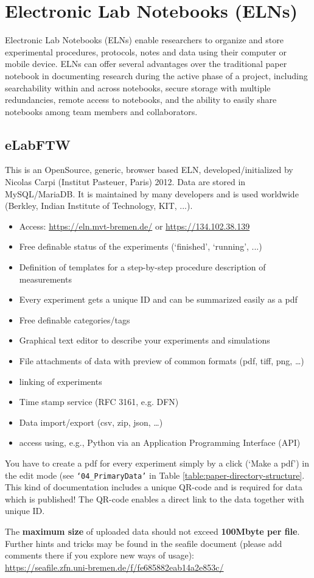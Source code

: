 \section[Electronic Lab Notebooks]{Electronic Lab Notebooks (ELNs)}\label{ssc:ELN}

Electronic Lab Notebooks (ELNs) enable researchers to organize and store
experimental procedures, protocols, notes and data using their computer or
mobile device. ELNs can offer several advantages over the traditional paper
notebook in documenting research during the active phase of a project, including
searchability within and across notebooks, secure storage with multiple
redundancies, remote access to notebooks, and the ability to easily share
notebooks among team members and collaborators.

\subsection{eLabFTW}

This is an OpenSource, generic, browser based ELN, developed/initialized by
Nicolas Carpi (Institut Pasteuer, Paris) 2012. Data are stored in MySQL/MariaDB.
It is maintained by many developers and is used worldwide (Berkley, Indian
Institute of Technology, KIT, ...).
\begin{itemize}
  \item Access: \url{https://eln.mvt-bremen.de/} or \url{https://134.102.38.139}
  \item Free definable status of the experiments (`finished', `running', ...)
  \item Definition of templates for a step-by-step procedure description of
        measurements
  \item Every experiment gets a unique ID and can be summarized easily as a pdf
  \item Free definable categories/tags
  \item Graphical text editor to describe your experiments and simulations
  \item File attachments of data with preview of common formats (pdf, tiff, png, …)
  \item linking of experiments
  \item Time stamp service (RFC 3161, e.g. DFN)
  \item Data import/export (csv, zip, json, …)
  \item access using, e.g., Python via an Application Programming Interface (API)
\end{itemize}

You have to create a pdf for every experiment simply by a click (‘Make a pdf’)
in the edit mode (see \texttt{‘04\_PrimaryData’} in Table
\ref{table:paper-directory-structure}. This kind of documentation includes a
unique QR-code and is required for data which is published! The QR-code enables
a direct link to the data together with unique ID.

The \textbf{maximum size} of uploaded data should not exceed
\textbf{100Mbyte per file}. Further hints and tricks may be found in the seafile
document (please add comments there if you explore new ways of usage): \\
\url{https://seafile.zfn.uni-bremen.de/f/fe685882eab14a2e853c/}
